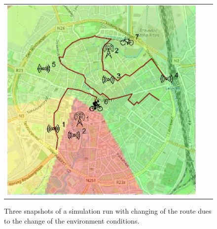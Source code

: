 \begin{figure}[h]
\begin{tabular}{lll}
         \includegraphics[scale=0.42]{figures/sim1snap3.png} 
    \end{tabular}
    \caption[Three snapshots of a simulation run with changing of the route]{Three snapshots of a simulation run with changing of the route dues to the change of the environment conditions.}
    \label{fig:sim1}
\end{figure}
% 

